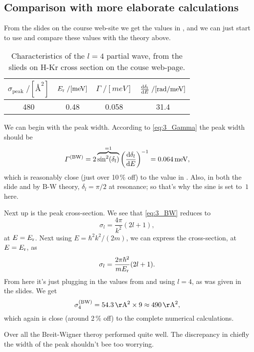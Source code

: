 \documentclass[11pt,letter, swedish, english
]{article}
\begin{document}
\subsection{Comparison with more elaborate calculations}
From the slides on the course web-site we get the values in
, and we can just start to use and compare these values
with the theory above.

\begin{table}\centering
\caption{Characteristics of the $l=4$ partial wave, from the slieds on
H-Kr cross section on the couse web-page.}
\label{tab:3}
\begin{tabular}{|c|c|c|c|}\hline
$\sigma_\text{peak}\;/[\unit{Å^2}]$  & $\Er\;/[\unit{meV}]$ &
$\varGamma\;/[\unit{meV}]$  & $\dv{\delta_l}{E}\;/[\unit{rad/meV}]$ 
\\ \hline
480 & 0.48 & 0.058 & 31.4\\ \hline
\end{tabular}
\end{table}

We can begin with the peak width. According to \eqref{eq:3_Gamma} the
peak width should be
\begin{equation}
\varGamma^\BW=2\overbrace{\sin^2(\delta_l)}^{=1}
\qty(\dv{\delta_l}{E})^{-1}
=\unit[0.064]{meV},
\end{equation}
which is reasonably close (just over 10\,\% off) to the value in
. Also, in both the slide and by B-W theory,
$\delta_l=\pi/2$ at resonance; so that's why the sine is set to~$1$ here.

Next up is the peak cross-section. We see that \eqref{eq:3_BW} reduces
to
\begin{equation}
\sigma_l=\frac{4\pi}{k^2} (2l+1),
\end{equation}
at $E=E_{\text{r}}$. Next using $E=\hbar^2k^2/(2m)$, we can express the
cross-section, at $E=E_{\text{r}}$, as
\begin{equation}\label{eq:3_BW_Er}
\sigma_l=\frac{2\pi\hbar^2}{mE_{\text{r}}} (2l+1).
\end{equation}
From here it's just plugging in the values from  and
using $l=4$, as was given in the slides. We get
\begin{equation}
\sigma_4^{\BW}=\unit[54.3]{Å^2}\times9\approx\unit[490]{Å^2},
\end{equation}
which again is close (around 2\,\% off) to the complete numerical
calculations. 

Over all the Breit-Wigner theroy performed quite well. The discrepancy
in chiefly the width of the peak shouldn't bee too worrying. 
\end{document}
